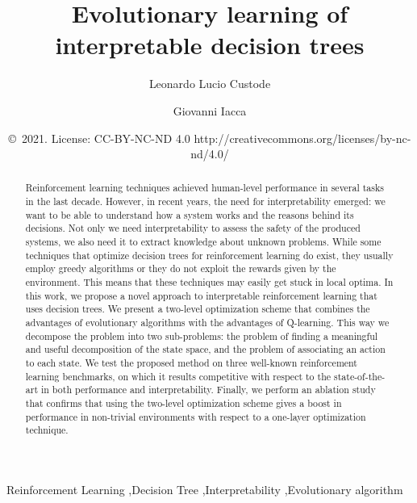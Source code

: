 \documentclass[review,english]{elsarticle}
\date{}
\begin{document}
\title{Evolutionary learning of interpretable decision trees}


\author{Leonardo Lucio Custode}
\author{Giovanni Iacca}
\address{Department of Information Engineering and Computer Science\\
University of Trento\\
Via Sommarive 9, 38123 Povo (Trento), Italy}
\date{{\copyright\ 2021. License: CC-BY-NC-ND 4.0
http://creativecommons.org/licenses/by-nc-nd/4.0/}}


\begin{abstract}
Reinforcement learning techniques achieved human-level performance in several tasks in the last decade.
However, in recent years, the need for interpretability emerged: we want to be able to understand how a system works and the reasons behind its decisions.
Not only we need interpretability to assess the safety of the produced systems, we also need it to extract knowledge about unknown problems.
While some techniques that optimize decision trees for reinforcement learning do exist, they usually employ greedy algorithms or they do not exploit the rewards given by the environment.
This means that these techniques may easily get stuck in local optima.
In this work, we propose a novel approach to interpretable reinforcement learning that uses decision trees. 
We present a two-level optimization scheme that combines the advantages of evolutionary algorithms with the advantages of Q-learning.
This way we decompose the problem into two sub-problems: the problem of finding a meaningful and useful decomposition of the state space, and the problem of associating an action to each state.
We test the proposed method on three well-known reinforcement learning benchmarks, on which it results competitive with respect to the state-of-the-art in both performance and interpretability.
Finally, we perform an ablation study that confirms that using the two-level optimization scheme gives a boost in performance in non-trivial environments with respect to a one-layer optimization technique.
\end{abstract}


\begin{keyword}
Reinforcement Learning \sep Decision Tree \sep Interpretability \sep Evolutionary algorithm
\end{keyword}

\maketitle
\end{document}
